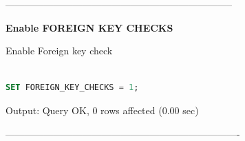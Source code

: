 \documentclass[12pt]{report}
\begin{document}
-----------------------------------------------------------------------

\textbf {Enable FOREIGN KEY CHECKS}

Enable Foreign key check
 
\begin{lstlisting}[language=sql]

SET FOREIGN_KEY_CHECKS = 1;
\end{lstlisting}

Output: Query OK, 0 rows affected (0.00 sec)

-------------------------------------------------------------------------
\end{document}
